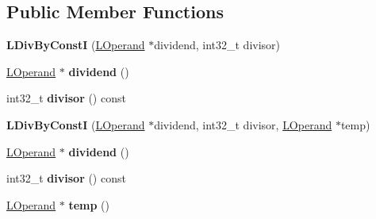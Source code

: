 \subsection*{Public Member Functions}
\begin{DoxyCompactItemize}
\item 
{\bfseries L\+Div\+By\+ConstI} (\hyperlink{classv8_1_1internal_1_1_l_operand}{L\+Operand} $\ast$dividend, int32\+\_\+t divisor)\hypertarget{classv8_1_1internal_1_1_l_div_by_const_i_a69f3e2310ac379ab63581e0fe18bc836}{}\label{classv8_1_1internal_1_1_l_div_by_const_i_a69f3e2310ac379ab63581e0fe18bc836}

\item 
\hyperlink{classv8_1_1internal_1_1_l_operand}{L\+Operand} $\ast$ {\bfseries dividend} ()\hypertarget{classv8_1_1internal_1_1_l_div_by_const_i_aa810bcd07c3b1e6e6fefc71b0125b9fb}{}\label{classv8_1_1internal_1_1_l_div_by_const_i_aa810bcd07c3b1e6e6fefc71b0125b9fb}

\item 
int32\+\_\+t {\bfseries divisor} () const \hypertarget{classv8_1_1internal_1_1_l_div_by_const_i_a54e98ed246800cdb3d19b87abf836d6a}{}\label{classv8_1_1internal_1_1_l_div_by_const_i_a54e98ed246800cdb3d19b87abf836d6a}

\item 
{\bfseries L\+Div\+By\+ConstI} (\hyperlink{classv8_1_1internal_1_1_l_operand}{L\+Operand} $\ast$dividend, int32\+\_\+t divisor, \hyperlink{classv8_1_1internal_1_1_l_operand}{L\+Operand} $\ast$temp)\hypertarget{classv8_1_1internal_1_1_l_div_by_const_i_a8b8f1c00e9b3ff2c2f0a5c7a44160bd7}{}\label{classv8_1_1internal_1_1_l_div_by_const_i_a8b8f1c00e9b3ff2c2f0a5c7a44160bd7}

\item 
\hyperlink{classv8_1_1internal_1_1_l_operand}{L\+Operand} $\ast$ {\bfseries dividend} ()\hypertarget{classv8_1_1internal_1_1_l_div_by_const_i_aa810bcd07c3b1e6e6fefc71b0125b9fb}{}\label{classv8_1_1internal_1_1_l_div_by_const_i_aa810bcd07c3b1e6e6fefc71b0125b9fb}

\item 
int32\+\_\+t {\bfseries divisor} () const \hypertarget{classv8_1_1internal_1_1_l_div_by_const_i_a54e98ed246800cdb3d19b87abf836d6a}{}\label{classv8_1_1internal_1_1_l_div_by_const_i_a54e98ed246800cdb3d19b87abf836d6a}

\item 
\hyperlink{classv8_1_1internal_1_1_l_operand}{L\+Operand} $\ast$ {\bfseries temp} ()\hypertarget{classv8_1_1internal_1_1_l_div_by_const_i_abc82598e955623d9f0aca9bb485d48f1}{}\label{classv8_1_1internal_1_1_l_div_by_const_i_abc82598e955623d9f0aca9bb485d48f1}


\end{DoxyCompactItemize}
